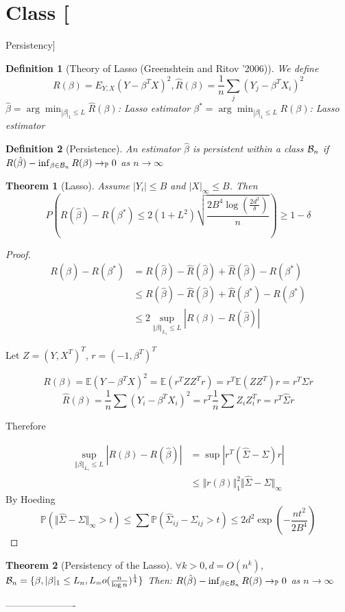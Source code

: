 \documentclass{article}
\newtheorem{theorem}{Theorem}
\newtheorem{definition}{Definition}
\newcommand{\esp}{{\mathbb E}}
\newcommand{\pr}{{\mathbb P}}
\newcommand{\norm}[1]{\Vert #1 \Vert}
\newenvironment{class}[1]
{\section*{Class #1}}
{ ----------------------}
\begin{document}
\begin{class}{3}[Persistency]
  \begin{definition}[Theory of Lasso (Greenshtein and Ritov '2006)]
    We define
    $$R(\beta) = E_{Y, X} (Y - \beta^TX)^2, \hat R(\beta) = \frac1n \sum_j (Y_j - \beta^TX_i)^2$$
    $\hat \beta = \arg\min_{|\beta|_1 \le L} \hat R(\beta)$: Lasso estimator
    $\beta^* = \arg\min_{|\beta|_1 \le L} R(\beta)$: Lasso estimator
  \end{definition}
  \begin{definition}[Persistence]
    An estimator $\hat \beta$ is persistent within a class ${\cal B}_n$ if $R(\hat \beta) - \inf_{\beta \in {\cal B}_n} R(\beta) \rightarrow_{\mathbb P} 0$ as $n \rightarrow \infty$
  \end{definition}
  \begin{theorem}[Lasso]
    Assume $|Y_i| \le B$ and $|X|_{\infty} \le B$. Then
    $$P\left(R(\hat \beta) - R(\beta^*) \le 2 (1 + L^2) \sqrt{\frac{2B^4\log(\frac{2d^2}{\delta})}n} \right) \ge 1 - \delta$$
  \end{theorem}

    \begin{proof}
      \begin{align*}
        R(\hat \beta) - R(\beta^*)
        &=  R(\hat \beta) - \hat R(\hat \beta) + \hat R(\hat \beta) - R(\beta^*)\\
        &\le R(\hat \beta) - \hat R(\hat \beta) + \hat R(\beta^*) - R(\beta^*)\\
        &\le 2 \sup_{\norm{\beta}_{L_1} \le L} |R(\beta) - R(\hat \beta)|
      \end{align*}

      Let $Z = (Y, X^T)^T$, $r = (-1, \beta^T)^T$

      $$R(\beta) = \esp(Y - \beta^TX)^2 = \esp(r^TZZ^Tr) = r^T \esp(ZZ^T)r = r^T \Sigma r$$
      $$\hat R(\beta) = \frac1n \sum (Y_i - \beta^TX_i)^2 =  r^T \frac1n \sum Z_iZ_i^T r = r^T \hat \Sigma r$$

      Therefore
      
      \begin{align*}
        \sup_{\norm{\beta}_{L_1} \le L} |R(\beta) - R(\hat \beta)|
        &= \sup |r^T(\hat \Sigma - \Sigma)r|
        \\&\le \norm{r(\beta)}_1^2 \norm{\hat \Sigma - \Sigma}_{\infty}
      \end{align*}
      By Hoeding
      $$\pr(\norm{\hat \Sigma - \Sigma}_{\infty} > t) \le \sum \pr(\hat \Sigma_{ij} - \Sigma_{ij} > t) \le 2 d^2 \exp(-\frac{nt^2}{2B^4})$$
      
    \end{proof}
    
  \begin{theorem}[Persistency of the Lasso]
    $\forall k > 0, d = O(n^k)$, ${\cal B}_n = \{\beta, |\beta|_1 \le L_n, L_ = o(\frac n{\log n})^{\frac14}\}$
    Then:
    $R(\hat \beta) - \inf_{\beta \in {\cal B}_n} R(\beta) \rightarrow_{\mathbb P} 0$ as $n \rightarrow \infty$
  \end{theorem}

\end{class}
\end{document}
